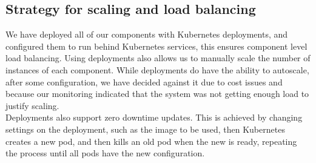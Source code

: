 \subsection{Strategy for scaling and load balancing}
We have deployed all of our components with Kubernetes deployments\cite{docs:kubernetes-deployment}, and configured them to run behind Kubernetes services\cite{docs:kubernetes-service}, this ensures component level load balancing.
Using deployments also allows us to manually scale the number of instances of each component. While deployments do have the ability to autoscale, after some configuration, we have decided against it due to cost issues and because our monitoring indicated that the system was not getting enough load to justify scaling.\\
Deployments also support zero downtime updates. This is achieved by changing settings on the deployment, such as the image to be used, then Kubernetes creates a new pod, and then kills an old pod when the new is ready, repeating the process until all pods have the new configuration.\\
